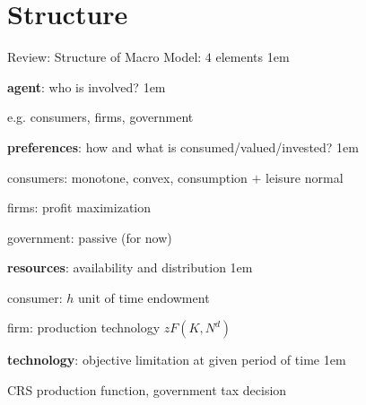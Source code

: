 \documentclass[11pt,aspectratio=43]{beamer}
\let\olditemize=\itemize
\let\endolditemize=\enditemize
\renewenvironment{itemize}{\olditemize \itemsep1em}{\endolditemize}
\let\oldenumerate=\enumerate
\let\endoldenumerate=\endenumerate
\renewenvironment{enumerate}{\oldenumerate \itemsep1em}{ \endoldenumerate}
\theoremstyle{definition}
\begin{document}
\section{Structure}
\label{sec:Structure}

\begin{frame}{Review: Structure of Macro Model: $ 4 $ elements}
\label{slide:Structure_of_Macro_Model____4___elements}
\begin{enumerate}
    \item \textbf{agent}: who is involved?
    \begin{itemize}
        \item e.g. consumers, firms, \alert{government}
    \end{itemize}
    \item \textbf{preferences}: how and what is consumed/valued/invested?
    \begin{itemize}
        \item \alert{consumers}: monotone, convex, consumption $+$ leisure normal
        \item \alert{firms}: profit maximization
        \item \alert{government}: passive (for now)
    \end{itemize}
    \item \textbf{resources}: availability and distribution
    \begin{itemize}
        \item \alert{consumer}: $ h $ unit of time endowment
        \item \alert{firm}: production technology $ z F( K, N^{d} ) $
    \end{itemize}
    \item \textbf{technology}: objective limitation at given period of time
    \begin{itemize}
        \item CRS production function, government tax decision
    \end{itemize}
\end{enumerate}
\end{frame}
\end{document}
